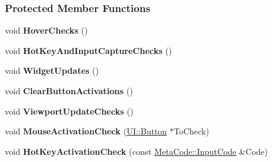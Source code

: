 \subsubsection*{Protected Member Functions}
\begin{DoxyCompactItemize}
\item 
\hypertarget{classphys_1_1UIManager_ae5beaafe73c68d39eb84463033941057}{
void {\bfseries HoverChecks} ()}
\label{classphys_1_1UIManager_ae5beaafe73c68d39eb84463033941057}

\item 
\hypertarget{classphys_1_1UIManager_aafbc4428f35b8ec2be7cff6fd0b534d1}{
void {\bfseries HotKeyAndInputCaptureChecks} ()}
\label{classphys_1_1UIManager_aafbc4428f35b8ec2be7cff6fd0b534d1}

\item 
\hypertarget{classphys_1_1UIManager_aefbf6f02f0b1049c321139fa399eb7ee}{
void {\bfseries WidgetUpdates} ()}
\label{classphys_1_1UIManager_aefbf6f02f0b1049c321139fa399eb7ee}

\item 
\hypertarget{classphys_1_1UIManager_a6ad508c48abf98bfccf3d04cd46d4f77}{
void {\bfseries ClearButtonActivations} ()}
\label{classphys_1_1UIManager_a6ad508c48abf98bfccf3d04cd46d4f77}

\item 
\hypertarget{classphys_1_1UIManager_aba919b3f29058271e4681f9ca7a8a17e}{
void {\bfseries ViewportUpdateChecks} ()}
\label{classphys_1_1UIManager_aba919b3f29058271e4681f9ca7a8a17e}

\item 
\hypertarget{classphys_1_1UIManager_af1e9285e30826b1c075bb8ca17fcc31e}{
void {\bfseries MouseActivationCheck} (\hyperlink{classphys_1_1UI_1_1Button}{UI::Button} $\ast$ToCheck)}
\label{classphys_1_1UIManager_af1e9285e30826b1c075bb8ca17fcc31e}

\item 
\hypertarget{classphys_1_1UIManager_a8340da0109e0c473af342ab4a514afc2}{
void {\bfseries HotKeyActivationCheck} (const \hyperlink{classphys_1_1MetaCode_a3e501cbb5bf0f6f1fdb7211465bda8d8}{MetaCode::InputCode} \&Code)}
\label{classphys_1_1UIManager_a8340da0109e0c473af342ab4a514afc2}

\end{DoxyCompactItemize}
